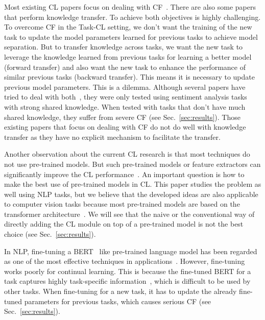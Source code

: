 \documentclass{article}
\begin{document}
Most existing CL papers focus on dealing with CF~\cite{ke2020mixed,chen2018lifelong}. There are also some papers that perform knowledge transfer. To achieve both objectives is highly challenging. To overcome CF in the Task-CL setting, we don't want the training of the new task to update the model parameters learned for previous tasks to achieve model separation. But to transfer knowledge across tasks, we want the new task to leverage the knowledge learned from previous tasks for learning a better model (forward transfer) and also want the new task to enhance the performance of similar previous tasks (backward transfer). This means it is necessary to update previous model parameters. This is a dilemma. {\color{black}Although several papers have tried to deal with both~\cite{ke2020continual,DBLP:conf/dasfaa/LvWLCZ19},} they were only tested using sentiment analysis tasks with strong shared knowledge. {\color{black}When tested with tasks that don't have much shared knowledge,} they suffer from severe CF (see Sec.~\ref{sec:results}). Those existing papers that focus on dealing with CF do not do well with knowledge transfer as they have no explicit mechanism to facilitate the transfer. 





{\color{black}Another observation about the current CL research is that most techniques do not use pre-trained models. But such pre-trained models or feature extractors can significantly improve the CL performance~\cite{hu2021continual,ke2021adapting}. An important question is how to make the best use of pre-trained models in CL. This paper studies the problem as well using NLP tasks, but we believe that the developed ideas are also applicable to computer vision tasks because most pre-trained models are based on the transformer architecture~\cite{vaswani2017attention}. We will see that the naive or the conventional way of directly adding the CL module on top of a pre-trained model is not the best choice (see Sec.~\ref{sec:results}).}

In NLP, fine-tuning a BERT~\cite{DBLP:conf/naacl/DevlinCLT19} like pre-trained language model has been regarded as one of the most effective techniques in applications~\cite{DBLP:conf/naacl/XuLSY19,sun-etal-2019-utilizing}. However, fine-tuning works poorly for continual learning. This is because the fine-tuned BERT for a task captures highly task-specific information~\cite{DBLP:journals/corr/abs-2004-14448}, which is difficult to be used by other tasks. When fine-tuning for a new task, it has to update the already fine-tuned parameters for previous tasks, which causes serious CF (see Sec.~\ref{sec:results}). 
\end{document}
